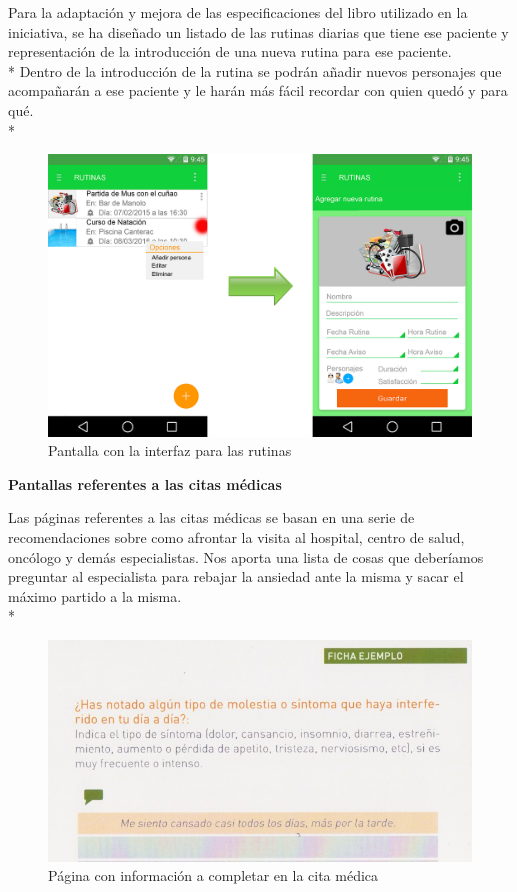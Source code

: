 \documentclass[../pfc.tex]{subfiles}
\begin{document}
		
		Para la adaptación y mejora de las especificaciones del libro utilizado en la iniciativa, se ha diseñado un listado de las rutinas diarias que tiene ese paciente y representación de la introducción de una nueva rutina para ese paciente.\\*
		Dentro de la introducción de la rutina se podrán añadir nuevos personajes que acompañarán a ese paciente y le harán más fácil recordar con quien quedó y para qué.\\*

		
		\begin{figure}[H]
			\centering
			\includegraphics[width=0.7\linewidth]{../images/rutina}
			\caption{Pantalla con la interfaz para las rutinas}
			\label{fig:rutina}
		\end{figure}
					
		
		\textbf{Pantallas referentes a las citas médicas}
		
		Las páginas referentes a las citas médicas se basan en una serie de recomendaciones sobre como afrontar la visita al hospital, centro de salud, oncólogo y demás especialistas. Nos aporta una lista de cosas que deberíamos preguntar al especialista para rebajar la ansiedad ante la misma y sacar el máximo partido a la misma.\\*
		
		\begin{figure}[H]
			\centering
			\includegraphics[width=0.7\linewidth]{../folleto/015_corto_a}
			\caption{Página con información a completar en la cita médica}
			\label{fig:preguntas}
		\end{figure}
		
\end{document}
